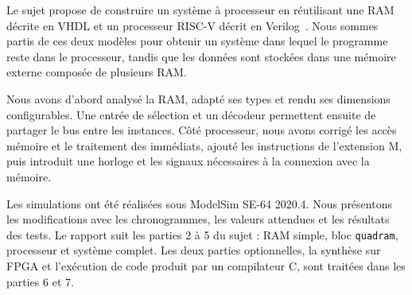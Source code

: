 
Le sujet propose de construire un système à processeur en réutilisant une RAM décrite en
VHDL et un processeur RISC-V décrit en Verilog~\cite{sujet}. Nous sommes partis de ces deux
modèles pour obtenir un système dans lequel le programme reste dans le processeur, tandis
que les données sont stockées dans une mémoire externe composée de plusieurs RAM.

Nous avons d'abord analysé la RAM, adapté ses types et rendu ses dimensions configurables.
Une entrée de sélection et un décodeur permettent ensuite de partager le bus entre les
instances. Côté processeur, nous avons corrigé les accès mémoire et le traitement des
immédiats, ajouté les instructions de l'extension M, puis introduit une horloge et les
signaux nécessaires à la connexion avec la mémoire.

Les simulations ont été réalisées sous ModelSim SE-64 2020.4. Nous présentons les
modifications avec les chronogrammes, les valeurs attendues et les résultats des tests.
Le rapport suit les parties 2 à 5 du sujet : RAM simple, bloc \texttt{quadram}, processeur
et système complet. Les deux parties optionnelles, la synthèse sur FPGA et l'exécution de
code produit par un compilateur C, sont traitées dans les parties 6 et 7.
